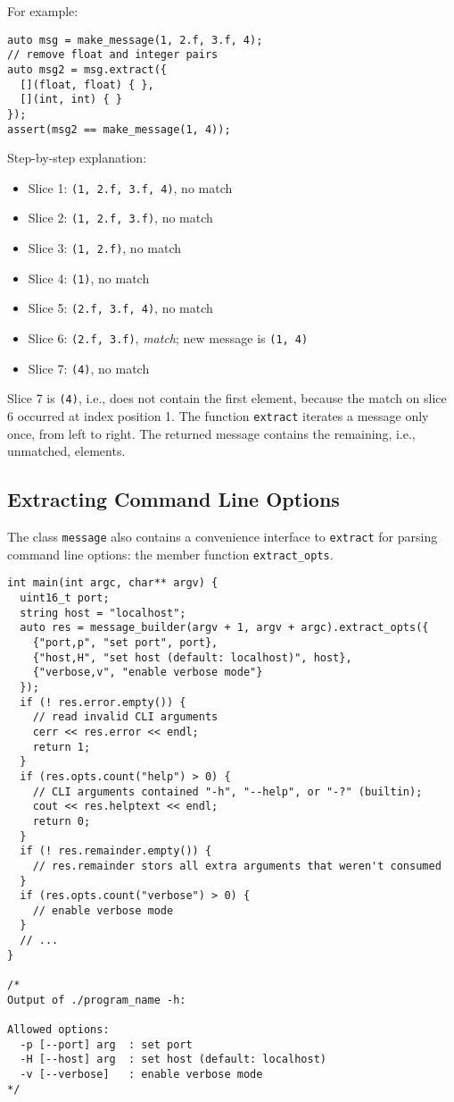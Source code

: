 For example:

\begin{lstlisting}
auto msg = make_message(1, 2.f, 3.f, 4);
// remove float and integer pairs
auto msg2 = msg.extract({
  [](float, float) { },
  [](int, int) { }
});
assert(msg2 == make_message(1, 4));
\end{lstlisting}

Step-by-step explanation:

\begin{itemize}
  \item Slice 1: \lstinline^(1, 2.f, 3.f, 4)^, no match
  \item Slice 2: \lstinline^(1, 2.f, 3.f)^, no match
  \item Slice 3: \lstinline^(1, 2.f)^, no match
  \item Slice 4: \lstinline^(1)^, no match
  \item Slice 5: \lstinline^(2.f, 3.f, 4)^, no match
  \item Slice 6: \lstinline^(2.f, 3.f)^, \emph{match}; new message is \lstinline^(1, 4)^
  \item Slice 7: \lstinline^(4)^, no match
\end{itemize}

Slice 7 is \lstinline^(4)^, i.e., does not contain the first element, because the match on slice 6 occurred at index position 1. The function \lstinline^extract^ iterates a message only once, from left to right.
The returned message contains the remaining, i.e., unmatched, elements.

\clearpage
\subsection{Extracting Command Line Options}
\label{extract-opts}

The class \lstinline^message^ also contains a convenience interface to \lstinline^extract^ for parsing command line options: the member function \lstinline^extract_opts^.

\begin{lstlisting}
int main(int argc, char** argv) {
  uint16_t port;
  string host = "localhost";
  auto res = message_builder(argv + 1, argv + argc).extract_opts({
    {"port,p", "set port", port},
    {"host,H", "set host (default: localhost)", host},
    {"verbose,v", "enable verbose mode"}
  });
  if (! res.error.empty()) {
    // read invalid CLI arguments
    cerr << res.error << endl;
    return 1;
  }
  if (res.opts.count("help") > 0) {
    // CLI arguments contained "-h", "--help", or "-?" (builtin);
    cout << res.helptext << endl;
    return 0;
  }
  if (! res.remainder.empty()) {
    // res.remainder stors all extra arguments that weren't consumed
  }
  if (res.opts.count("verbose") > 0) {
    // enable verbose mode
  }
  // ...
}

/*
Output of ./program_name -h:

Allowed options:
  -p [--port] arg  : set port
  -H [--host] arg  : set host (default: localhost)
  -v [--verbose]   : enable verbose mode
*/
\end{lstlisting}
